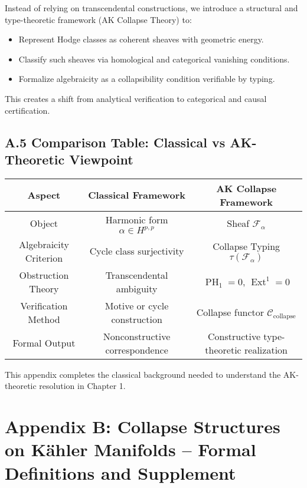 \documentclass[11pt]{article}
\DeclareMathOperator{\Ext}{Ext}
\DeclareMathOperator{\PH}{PH}
\begin{document}
Instead of relying on transcendental constructions, we introduce a structural and type-theoretic framework (AK Collapse Theory) to:

\begin{itemize}
  \item Represent Hodge classes as coherent sheaves with geometric energy.
  \item Classify such sheaves via homological and categorical vanishing conditions.
  \item Formalize algebraicity as a collapsibility condition verifiable by typing.
\end{itemize}

This creates a shift from analytical verification to categorical and causal certification.

\subsection*{A.5 Comparison Table: Classical vs AK-Theoretic Viewpoint}

\begin{center}
\begin{tabular}{|c|c|c|}
\hline
\textbf{Aspect} & \textbf{Classical Framework} & \textbf{AK Collapse Framework} \\
\hline
Object & Harmonic form $\alpha \in H^{p,p}$ & Sheaf $\mathcal{F}_\alpha$ \\
\hline
Algebraicity Criterion & Cycle class surjectivity & Collapse Typing $\tau(\mathcal{F}_\alpha)$ \\
\hline
Obstruction Theory & Transcendental ambiguity & $\PH_1 = 0$, $\Ext^1 = 0$ \\
\hline
Verification Method & Motive or cycle construction & Collapse functor $\mathcal{C}_{\text{collapse}}$ \\
\hline
Formal Output & Nonconstructive correspondence & Constructive type-theoretic realization \\
\hline
\end{tabular}
\end{center}

This appendix completes the classical background needed to understand the AK-theoretic resolution in Chapter 1.



\section*{Appendix B: Collapse Structures on Kähler Manifolds – Formal Definitions and Supplement}
\end{document}
